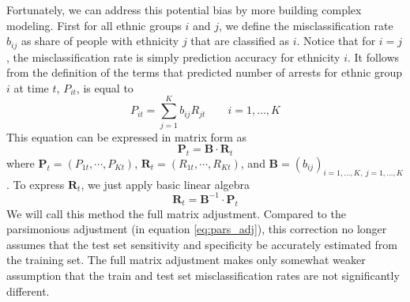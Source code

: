 Fortunately, we can address this potential bias by more building complex modeling.
First for all ethnic groups $i$ and $j$, we define the misclassification rate $b_{ij}$ as share of people with ethnicity $j$ that are classified as $i$.
Notice that for $i = j$, the misclassification rate is simply prediction accuracy for ethnicity $i$.
It follows from the definition of the terms that predicted number of arrests for ethnic group $i$ at time $t$,  $P_{it}$, is equal to 
\begin{equation}
P_{it}  = \sum_{j = 1}^{K} b_{ij} R_{jt} \qquad i = 1, \dots, K
\end{equation}
This equation can be expressed in matrix form as
\begin{equation}
 \mathbf{P}_t = \mathbf{B} \cdot \mathbf{R}_t 
\end{equation}
where $\mathbf{P}_t = \left(P_{1t}, \cdots, P_{Kt} \right)$, $\mathbf{R}_t = \left(R_{1t}, \cdots, R_{Kt} \right)$, and $\mathbf{B} = \left(b_{ij}\right)_{i = 1, \dots, K,\:j = 1, \dots, K}$.
To express $\mathbf{R}_t$, we just  apply basic linear algebra
\begin{equation}
\mathbf{R}_t  = \mathbf{B}^{-1} \cdot  \mathbf{P}_t
\end{equation}
We will call this method the full matrix adjustment. Compared to the parsimonious adjustment (in equation \ref{eq:pars_adj}), this correction no longer assumes that the test set sensitivity and specificity be accurately estimated  from the training set.  The full matrix adjustment
makes only somewhat weaker assumption that the train and test set misclassification rates are not significantly different. 







